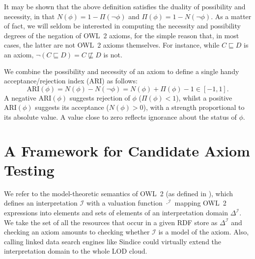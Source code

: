 \documentclass{llncs}
\begin{document}
It may be shown that the above definition satisfies the duality of
possibility and necessity, in that $N(\phi) = 1 - \Pi(\neg\phi)$ and
$\Pi(\phi) = 1 - N(\neg\phi)$.
As a matter of fact, we will seldom be interested in computing the necessity and
possibility degrees of the negation of OWL~2 axioms, for the simple reason that, in most cases,
the latter are not OWL~2 axioms themselves. For instance, while $C \sqsubseteq D$
is an axiom, $\neg(C \sqsubseteq D) = C \not\sqsubseteq D$ is not.



We combine the possibility and necessity of an axiom to define
a single handy acceptance/rejection index (ARI) as follows:
\begin{equation}\label{eq:ARI}
  \mathrm{ARI}(\phi) = N(\phi) - N(\neg\phi) = N(\phi) + \Pi(\phi) - 1 \in [-1, 1].
\end{equation}
A negative $\mathrm{ARI}(\phi)$ suggests rejection of $\phi$ ($\Pi(\phi)<1$),
whilst a positive $\mathrm{ARI}(\phi)$ suggests its acceptance ($N(\phi)>0$),
with a strength proportional to its absolute value. A value close to zero
reflects ignorance about the status of $\phi$.

\section{A Framework for Candidate Axiom Testing}
\label{OWL2SPARQL} 
We refer to the model-theoretic semantics of OWL~2  (as defined in \cite{OWL2-direct-semantics}),
which defines an interpretation $\mathcal{I}$ with a valuation function
$\cdot^\mathcal{I}$ mapping OWL~2 expressions into
elements and sets of elements of an interpretation domain $\Delta^\mathcal{I}$.
We take the set of all the resources that occur in a given RDF store 
as $\Delta^\mathcal{I}$ and checking an axiom amounts to checking
whether $\mathcal{I}$ is a model of the axiom. Also, calling linked data search engines
like Sindice could virtually extend the interpretation domain to the whole LOD cloud.
\end{document}
